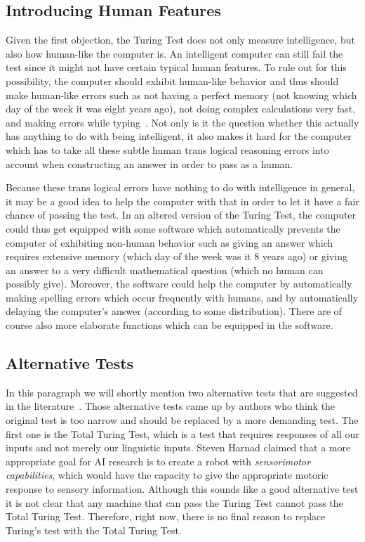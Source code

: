 \subsection{Introducing Human Features}
Given the first objection, the Turing Test does not only measure intelligence, but also how human-like the computer is. An intelligent computer can still fail the test since it might not have certain typical human features. To rule out for this possibility, the computer should exhibit human-like behavior and thus should make human-like errors such as not having a perfect memory (not knowing which day of the week it was eight years ago), not doing complex calculations very fast, and making errors while typing~\cite{epstein2009parsing}. Not only is it the question whether this actually has anything to do with being intelligent, it also makes it hard for the computer which has to take all these subtle human trans logical reasoning errors into account when constructing an answer in order to pass as a human.

Because these trans logical errors have nothing to do with intelligence in general, it may be a good idea to help the computer with that in order to let it have a fair chance of passing the test. In an altered version of the Turing Test, the computer could thus get equipped with some software which automatically prevents the computer of exhibiting non-human behavior such as giving an answer which requires extensive memory (which day of the week was it 8 years ago) or giving an answer to a very difficult mathematical question (which no human can possibly give). Moreover, the software could help the computer by automatically making spelling errors which occur frequently with humans, and by automatically delaying the computer's answer (according to some distribution). There are of course also more elaborate functions which can be equipped in the software.


\subsection{Alternative Tests}
In this paragraph we will shortly mention two alternative tests that are suggested in the literature~\cite{sep-turing-test}. Those alternative tests came up by authors who think the original test is too narrow and should be replaced by a more demanding test. The first one is the Total Turing Test, which is a test that requires responses of all our inputs and not merely our linguistic inputs. Steven Harnad claimed that a more appropriate goal for AI research is to create a robot with \textit{sensorimotor capabilities}, which would have the capacity to give the appropriate motoric response to sensory information. Although this sounds like a good alternative test it is not clear that any machine that can pass the Turing Test cannot pass the Total Turing Test. Therefore, right now, there is no final reason to replace Turing's test with the Total Turing Test.

